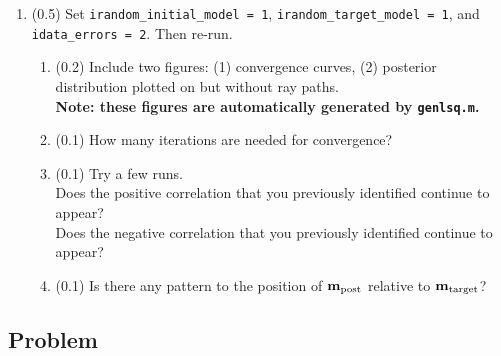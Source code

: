\documentclass[11pt,titlepage,fleqn]{article}
\begin{document}
\begin{enumerate}

\item (0.5) Set \verb+irandom_initial_model = 1+, \verb+irandom_target_model = 1+, and \verb+idata_errors = 2+. Then re-run.
%
\begin{enumerate}
\item (0.2) Include two figures: (1) convergence curves, (2) posterior distribution plotted on  but without ray paths. \\
{\bf Note: these figures are automatically generated by \verb+genlsq.m+.}
\item (0.1) How many iterations are needed for convergence?
\item (0.1) Try a few runs. \\
Does the positive correlation that you previously identified continue to appear? \\
Does the negative correlation that you previously identified continue to appear?
\item (0.1) Is there any pattern to the position of $\mbox{${\bf m}$}_{\rm post}$ relative to $\mbox{${\bf m}$}_{\rm target}$?
\end{enumerate}

\end{enumerate}


\subsection*{Problem} \howmuchtime\





\clearpage\pagebreak
%


\end{document}
